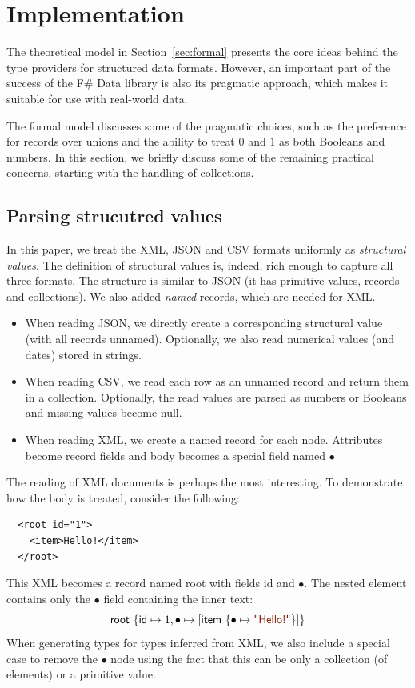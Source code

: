 \documentclass[preprint]{sigplanconf}
\newcommand{\kvd}[1]{\textnormal{\textcolor{kvdclr}{\sffamily #1}}}
\newcommand{\str}[1]{\textnormal{\textcolor{strclr}{\sffamily "#1"}}}
\newcommand{\ident}[1]{\textnormal{\sffamily #1}}
\begin{document}
\section{Implementation}
\label{sec:impl}

The theoretical model in Section~\ref{sec:formal} presents the core ideas behind the type 
providers for structured data formats. However, an important part of the success of the F\# Data
library is also its pragmatic approach, which makes it suitable for use with real-world data.

The formal model discusses some of the pragmatic choices, such as the preference for records over 
unions and the ability to treat $0$ and $1$ as both Booleans and numbers. In this section, we briefly
discuss some of the remaining practical concerns, starting with the handling of collections.


\subsection{Parsing strucutred values}
\label{sec:impl-parsing}

In this paper, we treat the XML, JSON and CSV formats uniformly as \emph{structural values}.
The definition of structural values is, indeed, rich enough to capture all three formats. The
structure is similar to JSON (it has primitive values, records and collections). We also added
\emph{named} records, which are needed for XML.
%
\begin{itemize}
\item When reading JSON, we directly create a corresponding structural value (with all records unnamed).
  Optionally, we also read numerical values (and dates) stored in strings.
\item When reading CSV, we read each row as an unnamed record and return them in a collection.
  Optionally, the read values are parsed as numbers or Booleans and missing values become \kvd{null}.
\item When reading XML, we create a named record for each node. Attributes become record fields and
  body becomes a special field named $\bullet$
\end{itemize}
%
The reading of XML documents is perhaps the most interesting. To demonstrate how the body is treated,
consider the following:
%
{\small{
\begin{verbatim}
  <root id="1">
    <item>Hello!</item>
  </root>    
\end{verbatim}
}}
%
\noindent
This XML becomes a record named \ident{root} with fields \ident{id} and $\bullet$. The nested element
contains only the $\bullet$ field containing the inner text:
%
\begin{equation*}
\ident{root}~\{ \ident{id} \mapsto 1, \bullet \mapsto [ \ident{item}~\{ \bullet \mapsto \str{Hello!} \}] \}
\end{equation*}
%
When generating types for types inferred from XML, we also include a special case to remove the $\bullet$
node using the fact that this can be only a collection (of elements) or a primitive value.
\end{document}
